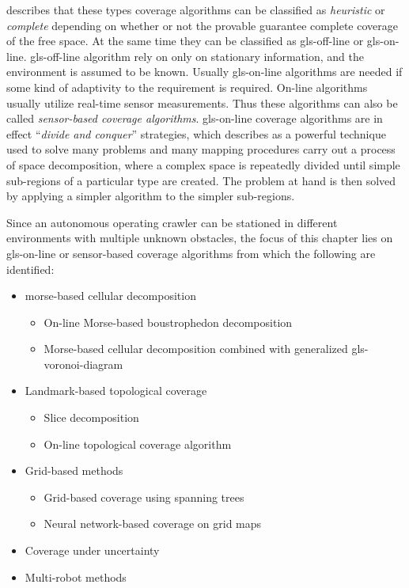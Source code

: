 \citet{galceran_towards_2014} describes that these types coverage algorithms can be classified as \emph{heuristic} or
\emph{complete} depending on whether or not the provable guarantee complete coverage of the free space. At the same time
they can be classified as \gls{gls-off-line} or \gls{gls-on-line}. \gls{gls-off-line} algorithm rely on only on
stationary information, and the environment is assumed to be known. Usually \gls{gls-on-line} algorithms are needed if
some kind of adaptivity to the requirement is required. On-line algorithms usually utilize real-time sensor
measurements. Thus these algorithms can also be called \emph{sensor-based coverage algorithms}. \gls{gls-on-line}
coverage algorithms are in effect ``\emph{divide and conquer}'' strategies, which \citet{wong_complete_2004} describes
as a powerful technique used to solve many problems and many mapping procedures carry out a process of space
decomposition, where a complex space is repeatedly divided until simple sub-regions of a particular type are created.
The
problem at hand is then solved by applying a simpler algorithm to the simpler sub-regions.

Since an autonomous operating crawler can be stationed in different environments with multiple unknown obstacles, the
focus of this chapter lies on \gls{gls-on-line} or sensor-based coverage algorithms from which the following are
identified:
\begin{itemize}
    \item morse-based cellular decomposition
    \begin{itemize}
        \item On-line Morse-based boustrophedon decomposition
        \item Morse-based cellular decomposition combined with generalized \gls{gls-voronoi-diagram}
    \end{itemize}
    \item Landmark-based topological coverage
    \begin{itemize}
        \item Slice decomposition
        \item On-line topological coverage algorithm
    \end{itemize}
    \item Grid-based methods
    \begin{itemize}
        \item Grid-based coverage using spanning trees
        \item Neural network-based coverage on grid maps
    \end{itemize}
    \item Coverage under uncertainty
    \item Multi-robot methods
\end{itemize}

